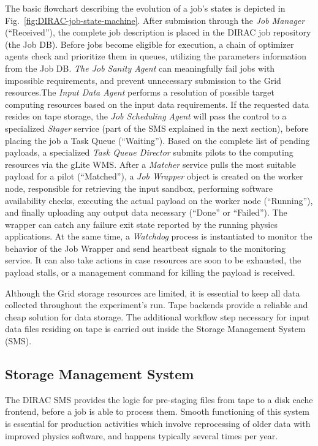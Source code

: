 \documentclass[10pt,conference]{IEEEtran}
\begin{document}
The basic flowchart describing the evolution of a job’s states is depicted in
Fig.~\ref{fig:DIRAC-job-state-machine}. After submission through the \textit{Job Manager} (``Received''), the complete
job description is placed in the DIRAC job repository (the Job DB). Before jobs
become eligible for execution, a chain of optimizer agents check and prioritize
them in queues, utilizing the parameters information from the Job DB. \textit{The Job
Sanity Agent} can meaningfully fail jobs with impossible requirements, and
prevent unnecessary submission to the Grid resources.The \textit{Input Data Agent}
performs a resolution of possible target computing resources based on the input
data requirements. If the requested data resides on tape storage, the \textit{Job
Scheduling Agent} will pass the control to a specialized \textit{Stager} service (part of
the SMS explained in the next section), before placing the job a Task Queue
(``Waiting''). Based on the complete list of pending payloads, a specialized \textit{Task
Queue Director} submits pilots to the computing resources via the gLite WMS. After
a \textit{Matcher} service pulls the most suitable payload for a pilot (``Matched''), a \textit{Job
Wrapper} object is created on the worker node, responsible for retrieving the
input sandbox, performing software availability checks, executing the actual
payload on the worker node (``Running''), and finally uploading any output data
necessary (“Done” or ``Failed''). The wrapper can catch any failure exit state
reported by the running physics applications. At the same time, a \textit{Watchdog}
process is instantiated to monitor the behavior of the Job Wrapper and send
heartbeat signals to the monitoring service. It can also take actions in case
resources are soon to be exhausted, the payload stalls, or a management command
for killing the payload is received.

Although the Grid storage resources are limited, it is essential to keep all
data collected throughout the experiment’s run. Tape backends provide a reliable
and cheap solution for data storage. The additional workflow step 
necessary for input data files residing on tape is carried out inside the
Storage Management System (SMS).

\subsection{Storage Management System}

The DIRAC SMS provides the logic for pre-staging files from tape to a disk cache
frontend, before a job is able to process them. Smooth functioning of this
system is essential for production activities which involve reprocessing of
older data with improved physics software, and happens typically several times
per year.
\end{document}
